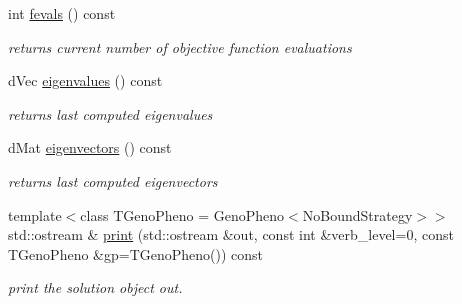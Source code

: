 \begin{DoxyCompactItemize}
int \hyperlink{classlibcmaes_1_1CMASolutions_a8b19ae50312e62c7feb810e8ff0d9dfd}{fevals} () const 
\begin{DoxyCompactList}\small\item\em returns current number of objective function evaluations \end{DoxyCompactList}\item 
d\+Vec \hyperlink{classlibcmaes_1_1CMASolutions_add38348a9496b9559e72a020b952a262}{eigenvalues} () const 
\begin{DoxyCompactList}\small\item\em returns last computed eigenvalues \end{DoxyCompactList}\item 
d\+Mat \hyperlink{classlibcmaes_1_1CMASolutions_a30bed04a6b034e834f1a2e74349de8af}{eigenvectors} () const 
\begin{DoxyCompactList}\small\item\em returns last computed eigenvectors \end{DoxyCompactList}\item 
{\footnotesize template$<$class T\+Geno\+Pheno  = Geno\+Pheno$<$\+No\+Bound\+Strategy$>$$>$ }\\std\+::ostream \& \hyperlink{classlibcmaes_1_1CMASolutions_a240bdb494e11ce06ac121fcb2724d634}{print} (std\+::ostream \&out, const int \&verb\+\_\+level=0, const T\+Geno\+Pheno \&gp=T\+Geno\+Pheno()) const 
\begin{DoxyCompactList}\small\item\em print the solution object out. \end{DoxyCompactList}\end{DoxyCompactItemize}
